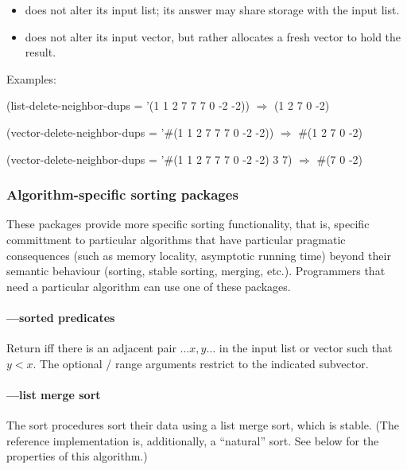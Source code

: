 \begin{itemize}
\item {} does not alter its input list; its answer
  may share storage with the input list.
\item {} does not alter its input vector, but
  rather allocates a fresh vector to hold the result.
\end{itemize}
%
Examples:

\begin{example}
(list-delete-neighbor-dups = '(1 1 2 7 7 7 0 -2 -2))
  \(\Longrightarrow\) (1 2 7 0 -2)

(vector-delete-neighbor-dups = '\#(1 1 2 7 7 7 0 -2 -2))
  \(\Longrightarrow\) \#(1 2 7 0 -2)

(vector-delete-neighbor-dups = '\#(1 1 2 7 7 7 0 -2 -2) 3 7)
  \(\Longrightarrow\) \#(7 0 -2)
\end{example}
         
\subsubsection{Algorithm-specific sorting packages}

These packages provide more specific sorting functionality, that is,
specific committment to particular algorithms that have particular
pragmatic consequences (such as memory locality, asymptotic running time)
beyond their semantic behaviour (sorting, stable sorting, merging, etc.).
Programmers that need a particular algorithm can use one of these packages.

\paragraph{---sorted predicates}
%
\begin{protos}
\end{protos}

Return  iff there is an adjacent pair \(\ldots x, y \ldots\) in the input
list or vector such that $y < x$. The optional / range 
arguments restrict  to the indicated subvector.

\paragraph{---list merge sort}
%
\begin{protos}
\end{protos}
%
The sort procedures sort their data using a list merge sort, which is
stable. (The reference implementation is, additionally, a ``natural'' sort.
See below for the properties of this algorithm.)

